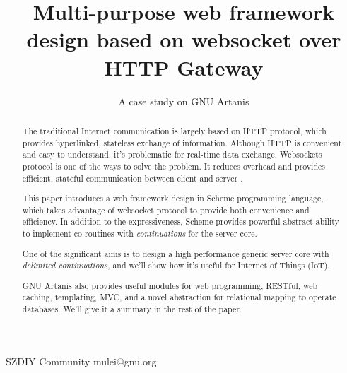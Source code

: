 \documentclass[numbers,numberedpars]{sigplanconf}
\begin{document}
\setlength{\pdfpageheight}{\paperheight}
\setlength{\pdfpagewidth}{\paperwidth}




\title{Multi-purpose web framework design based on websocket over HTTP Gateway}
\subtitle{A case study on GNU Artanis}

           {SZDIY Community}
           {mulei@gnu.org}

\maketitle

\begin{abstract}
  The traditional Internet communication is largely based on HTTP protocol, which provides hyperlinked, stateless exchange of information.
  Although HTTP is convenient and easy to understand, it's problematic for real-time data exchange. Websockets protocol is one of the ways
  to solve the problem. It reduces overhead and provides efficient, stateful communication between client and server \citep{6197172}.
  
  This paper introduces a web framework design in Scheme programming language, which takes advantage of websocket protocol to provide both
  convenience and efficiency. In addition to the expressiveness, Scheme provides powerful abstract ability to implement co-routines with
  {\it continuations} for the server core.

  One of the significant aims is to design a high performance generic server core with {\it delimited continuations}, and we'll show how it's
  useful for Internet of Things (IoT).
  
  GNU Artanis also provides useful modules for web programming, RESTful, web caching, templating, MVC, and a novel abstraction for relational
  mapping to operate databases. We'll give it a summary in the rest of the paper.
\end{abstract}
\end{document}
